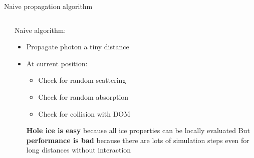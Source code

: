 \begin{frame}[fragile]{Naive propagation algorithm}
  \begin{columns}
    \begin{column}{0.5\textwidth}
    \end{column}

    \begin{column}{0.5\textwidth}

      Naive algorithm:

      \begin{itemize}
        \item Propagate photon a tiny distance
        \item At current position:
        \begin{itemize}
          \item Check for random scattering
          \item Check for random absorption
          \item Check for collision with DOM
        \end{itemize}

        \follows \textbf{Hole ice is easy} because all ice properties can be locally evaluated
        \follows But \textbf{performance is bad} because there are lots of simulation steps even for long distances without interaction
      \end{itemize}

    \end{column}
  \end{columns}
\end{frame}
